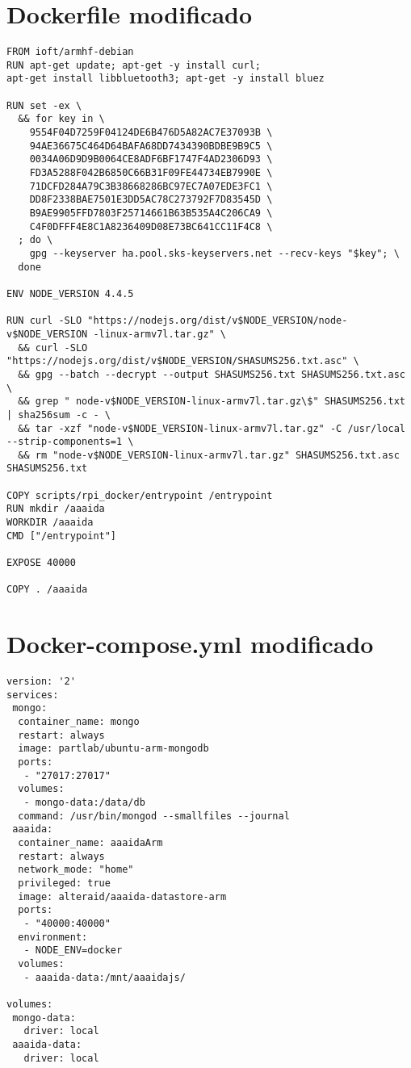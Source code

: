 \section{Dockerfile modificado}
\begin{lstlisting}[style=Bash]
FROM ioft/armhf-debian
RUN apt-get update; apt-get -y install curl; 
apt-get install libbluetooth3; apt-get -y install bluez

RUN set -ex \
  && for key in \
    9554F04D7259F04124DE6B476D5A82AC7E37093B \
    94AE36675C464D64BAFA68DD7434390BDBE9B9C5 \
    0034A06D9D9B0064CE8ADF6BF1747F4AD2306D93 \
    FD3A5288F042B6850C66B31F09FE44734EB7990E \
    71DCFD284A79C3B38668286BC97EC7A07EDE3FC1 \
    DD8F2338BAE7501E3DD5AC78C273792F7D83545D \
    B9AE9905FFD7803F25714661B63B535A4C206CA9 \
    C4F0DFFF4E8C1A8236409D08E73BC641CC11F4C8 \
  ; do \
    gpg --keyserver ha.pool.sks-keyservers.net --recv-keys "$key"; \
  done

ENV NODE_VERSION 4.4.5

RUN curl -SLO "https://nodejs.org/dist/v$NODE_VERSION/node-v$NODE_VERSION -linux-armv7l.tar.gz" \
  && curl -SLO "https://nodejs.org/dist/v$NODE_VERSION/SHASUMS256.txt.asc" \
  && gpg --batch --decrypt --output SHASUMS256.txt SHASUMS256.txt.asc \
  && grep " node-v$NODE_VERSION-linux-armv7l.tar.gz\$" SHASUMS256.txt | sha256sum -c - \
  && tar -xzf "node-v$NODE_VERSION-linux-armv7l.tar.gz" -C /usr/local --strip-components=1 \
  && rm "node-v$NODE_VERSION-linux-armv7l.tar.gz" SHASUMS256.txt.asc SHASUMS256.txt

COPY scripts/rpi_docker/entrypoint /entrypoint
RUN mkdir /aaaida
WORKDIR /aaaida
CMD ["/entrypoint"]

EXPOSE 40000

COPY . /aaaida
\end{lstlisting}

\section{Docker-compose.yml modificado}
\begin{lstlisting}[language=docker-compose-2,breaklines=true,label={code:compose}]
version: '2'
services:
 mongo:
  container_name: mongo
  restart: always
  image: partlab/ubuntu-arm-mongodb
  ports:
   - "27017:27017"
  volumes:
   - mongo-data:/data/db
  command: /usr/bin/mongod --smallfiles --journal
 aaaida:
  container_name: aaaidaArm
  restart: always
  network_mode: "home"
  privileged: true
  image: alteraid/aaaida-datastore-arm
  ports:
   - "40000:40000"
  environment:
   - NODE_ENV=docker
  volumes:
   - aaaida-data:/mnt/aaaidajs/

volumes:
 mongo-data:
   driver: local
 aaaida-data:
   driver: local  
\end{lstlisting}